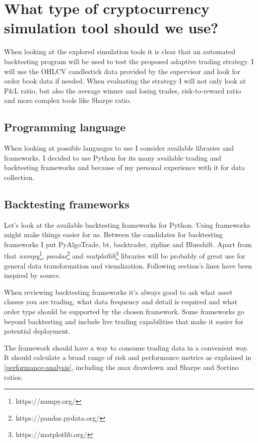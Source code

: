 \section{What type of cryptocurrency simulation tool should we use?}
When looking at the explored simulation tools it is clear that an automated backtesting program will be used to test the proposed adaptive trading strategy. I will use the OHLCV candlestick data provided by the supervisor and look for order book data if needed. When evaluating the strategy I will not only look at P\&L ratio, but also the average winner and losing trades, risk-to-reward ratio and more complex tools like Sharpe ratio.

\subsection*{Programming language}
When looking at possible languages to use I consider available libraries and frameworks. I decided to use Python for its many available trading and backtesting frameworks and because of my personal experience with it for data collection.

\subsection*{Backtesting frameworks}
Let's look at the available backtesting frameworks for Python. Using frameworks might make things easier for us. Between the candidates for backtesting frameworks I put PyAlgoTrade, bt, backtrader, zipline and Blueshift. Apart from that \emph{numpy}\footnote{https://numpy.org/}, \emph{pandas}\footnote{https://pandas.pydata.org/} and \emph{matplotlib}\footnote{https://matplotlib.org/} libraries will be probably of great use for general data transformation and visualization. Following section's lines have been inspired by \cite{python-backtesting-frameworks} source.

When reviewing backtesting frameworks it's always good to ask what asset classes you are trading, what data frequency and detail is required and what order type should be supported by the chosen framework. Some frameworks go beyond backtesting and include live trading capabilities that make it easier for potential deployment. 

The framework should have a way to consume trading data in a convenient way. It should calculate a broad range of risk and performance metrics as explained in \ref{performance-analysis}, including the max drawdown and Sharpe and Sortino ratios.

